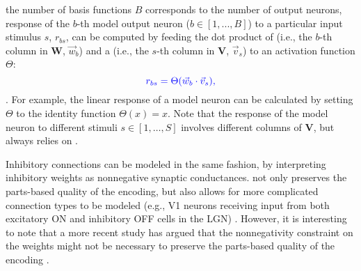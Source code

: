 \begin{figure}[h]
	\centering
    \caption{}
	\label{fig:nsc-bias-variance-dilemma}
\end{figure}

 the number of basis functions $B$ 
corresponds to the number of output neurons, 
response of the $b$-th model output neuron
($b \in [1, ..., B]$)
to a particular input stimulus $s$,  $r_{bs}$,
can be computed by feeding the dot product of
(i.e., the $b$-th column in $\mathbf{W}$, $\vec{w}_b$)
and a 
(i.e., the $s$-th column in \textbf{V}, $\vec{v}_s$)
to an activation function $\Theta$:
\begin{equation}
\textcolor{blue}{r_{bs} = \Theta(\vec{w}_b \cdot \vec{v}_s),}
\label{eqn:nsc-model-response}
\end{equation}
.
For example, the linear response of a model neuron
can be calculated by setting $\Theta$ to the identity function $\Theta(x)=x$.
Note that the response of the model neuron to different stimuli 
$s \in [1, \ldots, S]$
involves different columns of \textbf{V},
but always relies on .

Inhibitory connections can be modeled in the same fashion,
by interpreting inhibitory  weights
as nonnegative synaptic conductances.
 not only preserves the parts-based quality of the encoding,
but also allows for more complicated connection types to be modeled
(e.g., \ac{V1} neurons receiving input from both excitatory ON
and inhibitory OFF cells in the \ac{LGN}) \cite{Hoyer2003}.
However, it is interesting to note that a more recent study has argued
that the nonnegativity constraint on the
 weights might not be necessary 
to preserve the parts-based quality of the encoding \cite{Liu2017}.


